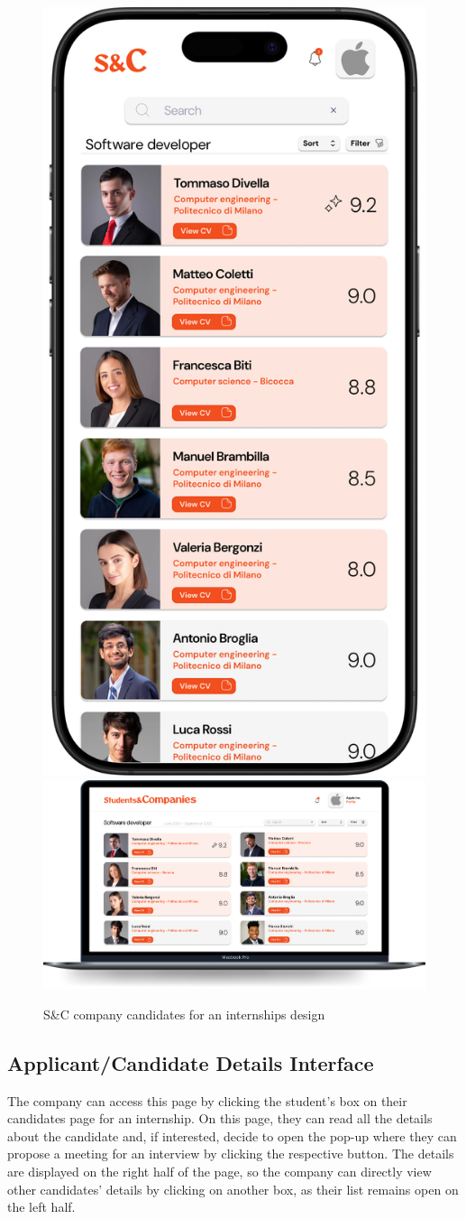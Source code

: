 \begin{figure}[H]
    \centering
    \includegraphics[width=0.2\linewidth]{Images/Mock-up/mobile candidate page company.png}
    \includegraphics[width=0.75\linewidth]{Images/Mock-up/cadidates page company.png}
    \caption{S\&C company candidates for an internships design}
    \label{fig:homepage-design}
\end{figure}

\subsection{Applicant/Candidate Details Interface}

The company can access this page by clicking the student's box on their candidates page for an internship. On this page, they can read all the details about the candidate and, if interested, decide to open the pop-up where they can propose a meeting for an interview by clicking the respective button. The details are displayed on the right half of the page, so the company can directly view other candidates' details by clicking on another box, as their list remains open on the left half. \\

